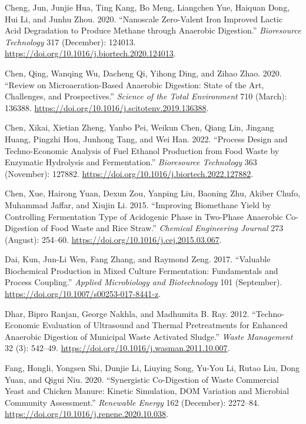 \documentclass[11pt]{report}
\begin{document}
\begin{hangparas}{1.5em}{1}
\hypertarget{citeproc_bib_item_8}{Cheng, Jun, Junjie Hua, Ting Kang, Bo Meng, Liangchen Yue, Haiquan Dong, Hui Li, and Junhu Zhou. 2020. “Nanoscale Zero-Valent Iron Improved Lactic Acid Degradation to Produce Methane through Anaerobic Digestion.” \textit{Bioresource Technology} 317 (December): 124013. \url{https://doi.org/10.1016/j.biortech.2020.124013}.}

\hypertarget{citeproc_bib_item_9}{Chen, Qing, Wanqing Wu, Dacheng Qi, Yihong Ding, and Zihao Zhao. 2020. “Review on Microaeration-Based Anaerobic Digestion: State of the Art, Challenges, and Prospectives.” \textit{Science of the Total Environment} 710 (March): 136388. \url{https://doi.org/10.1016/j.scitotenv.2019.136388}.}

\hypertarget{citeproc_bib_item_10}{Chen, Xikai, Xietian Zheng, Yanbo Pei, Weikun Chen, Qiang Lin, Jingang Huang, Pingzhi Hou, Junhong Tang, and Wei Han. 2022. “Process Design and Techno-Economic Analysis of Fuel Ethanol Production from Food Waste by Enzymatic Hydrolysis and Fermentation.” \textit{Bioresource Technology} 363 (November): 127882. \url{https://doi.org/10.1016/j.biortech.2022.127882}.}

\hypertarget{citeproc_bib_item_11}{Chen, Xue, Hairong Yuan, Dexun Zou, Yanping Liu, Baoning Zhu, Akiber Chufo, Muhammad Jaffar, and Xiujin Li. 2015. “Improving Biomethane Yield by Controlling Fermentation Type of Acidogenic Phase in Two-Phase Anaerobic Co-Digestion of Food Waste and Rice Straw.” \textit{Chemical Engineering Journal} 273 (August): 254–60. \url{https://doi.org/10.1016/j.cej.2015.03.067}.}

\hypertarget{citeproc_bib_item_12}{Dai, Kun, Jun-Li Wen, Fang Zhang, and Raymond Zeng. 2017. “Valuable Biochemical Production in Mixed Culture Fermentation: Fundamentals and Process Coupling.” \textit{Applied Microbiology and Biotechnology} 101 (September). \url{https://doi.org/10.1007/s00253-017-8441-z}.}

\hypertarget{citeproc_bib_item_13}{Dhar, Bipro Ranjan, George Nakhla, and Madhumita B. Ray. 2012. “Techno-Economic Evaluation of Ultrasound and Thermal Pretreatments for Enhanced Anaerobic Digestion of Municipal Waste Activated Sludge.” \textit{Waste Management} 32 (3): 542–49. \url{https://doi.org/10.1016/j.wasman.2011.10.007}.}

\hypertarget{citeproc_bib_item_14}{Fang, Hongli, Yongsen Shi, Dunjie Li, Liuying Song, Yu-You Li, Rutao Liu, Dong Yuan, and Qigui Niu. 2020. “Synergistic Co-Digestion of Waste Commercial Yeast and Chicken Manure: Kinetic Simulation, DOM Variation and Microbial Community Assessment.” \textit{Renewable Energy} 162 (December): 2272–84. \url{https://doi.org/10.1016/j.renene.2020.10.038}.}


\end{hangparas}
\end{document}
